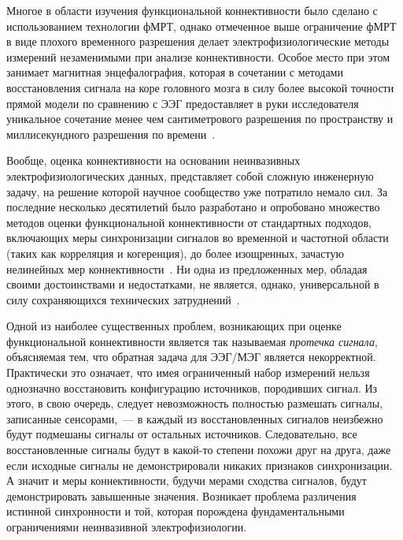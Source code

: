 Многое в области изучения функциональной коннективности было сделано с
использованием технологии фМРТ, однако отмеченное выше ограничение фМРТ в виде
плохого временного разрешения делает электрофизиологические методы измерений
незаменимыми при анализе коннективности. Особое место при этом занимает
магнитная энцефалография, которая в сочетании с методами восстановления сигнала
на коре головного мозга в силу более высокой точности прямой модели по
сравнению с ЭЭГ предоставляет в руки исследователя уникальное сочетание менее
чем сантиметрового разрешения по пространству и миллисекундного разрешения по
времени~\cite{hamalainen, Baillet, Gross2013}.



Вообще, оценка коннективности на основании неинвазивных электрофизиологических
данных, представляет собой сложную инженерную задачу, на решение которой
научное сообщество уже потратило немало сил.  За последние несколько
десятилетий было разработано и опробовано множество методов оценки
функциональной коннективности от стандартных подходов, включающих меры
синхронизации сигналов во временной и частотной области (таких как корреляция и
когеренция), до более изощренных, зачастую нелинейных мер
коннективности~\cite{Marzetti2008, Schoffelen2009, Colclough2015, kaminski,
greenblatt_conn, hillebrand, imcoh, Lachaux1999, env_corr, Brookes2012,
Brookes2011, Hillebrand2012, Hipp2012, PLI, wPLI, Chella2015, Chella2016,
Wibral2011, Ioannides2000}.  Ни одна из предложенных мер, обладая своими
достоинствами и недостатками, не является, однако, универсальной в силу
сохраняющихся технических затруднений~\cite{Colclough2016, Bastos2016}.

Одной из наиболее существенных проблем, возникающих при оценке функциональной
коннективности является так называемая \emph{протечка сигнала}, объясняемая
тем, что обратная задача для ЭЭГ/МЭГ является некорректной. Практически это
означает, что имея ограниченный набор измерений нельзя однозначно восстановить
конфигурацию источников, породивших сигнал. Из этого, в свою очередь, следует
невозможность полностью размешать сигналы, записанные сенсорами,~--- в каждый
из восстановленных сигналов неизбежно будут подмешаны сигналы от остальных
источников. Следовательно, все восстановленные сигналы будут в какой-то степени
похожи друг на друга, даже если исходные сигналы не демонстрировали никаких
признаков синхронизации. А значит и меры коннективности, будучи мерами сходства
сигналов, будут демонстрировать завышенные значения.
Возникает проблема различения
истинной синхронности и той, которая порождена фундаментальными ограничениями
неинвазивной электрофизиологии.


